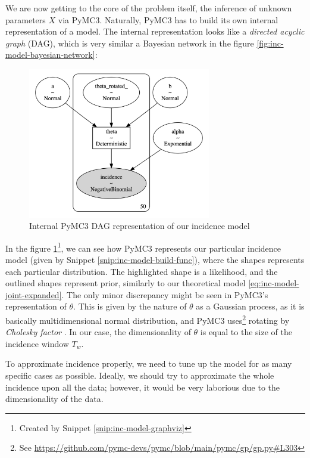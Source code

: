\documentclass[
  digital, %
  oneside, %
  lof,     %
  lot,     %
]{fithesis4}
\begin{document}
We are now getting to the core of the problem itself, the inference of unknown parameters $X$ via PyMC3. 
Naturally, PyMC3 has to build its own internal representation of a model.
The internal representation looks like a \textit{directed acyclic graph} (DAG), which is very similar a Bayesian network in the figure \ref{fig:inc-model-bayesian-network}:

\begin{figure}[H]
  \begin{center}
    \includegraphics[width=8cm]{static/images/inc-model-graphviz.png}
  \end{center}
  \caption{Internal PyMC3 DAG representation of our incidence model}
  \label{fig:inc-model-graphviz}
\end{figure}

In the figure \ref{fig:inc-model-graphviz}\footnote{Created by Snippet \ref{snip:inc-model-graphviz}}, we can see how PyMC3 represents our particular incidence model (given by Snippet \ref{snip:inc-model-build-func}), where the shapes represents each particular distribution.
The highlighted shape is a likelihood, and the outlined shapes represent prior, similarly to our theoretical model \eqref{eq:inc-model-joint-expanded}.
The only minor discrepancy might be seen in PyMC3's representation of $\theta$.
This is given by the nature of $\theta$ as a Gaussian process, as it is basically multidimensional normal distribution, and PyMC3 uses\footnote{See \url{https://github.com/pymc-devs/pymc/blob/main/pymc/gp/gp.py\#L303}} rotating by \textit{Cholesky factor} \cite[Chapter 7]{murphy2021}.
In our case, the dimensionality of $\theta$ is equal to the size of the incidence window $T_w$.

To approximate incidence properly, we need to tune up the model for as many specific cases as possible. Ideally, we should try to approximate the whole incidence upon all the data; however, it would be very laborious due to the dimensionality of the data.
\end{document}
